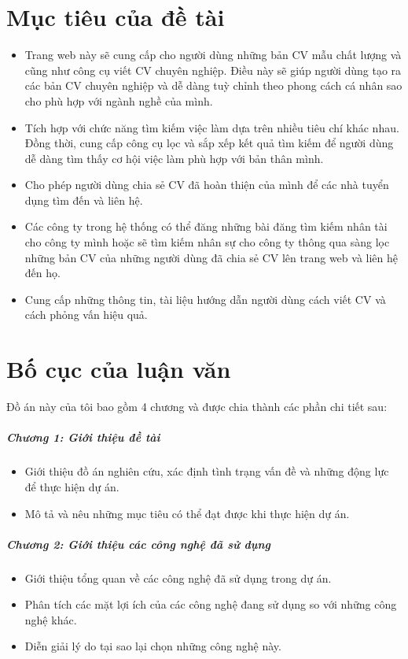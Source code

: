 \section{Mục tiêu của đề tài}

\begin{itemize}
    \item Trang web này sẽ cung cấp cho người dùng những bản CV mẫu chất lượng và cũng như công cụ viết CV chuyên nghiệp. Điều này sẽ giúp người dùng tạo ra các bản CV chuyên nghiệp và dễ dàng tuỳ chỉnh theo phong cách cá nhân sao cho phù hợp với ngành nghề của mình.
    \item Tích hợp với chức năng tìm kiếm việc làm dựa trên nhiều tiêu chí khác nhau. Đồng thời, cung cấp công cụ lọc và sắp xếp kết quả tìm kiếm để người dùng dễ dàng tìm thấy cơ hội việc làm phù hợp với bản thân mình.
    \item Cho phép người dùng chia sẻ CV đã hoàn thiện của mình để các nhà tuyển dụng tìm đến và liên hệ.
    \item Các công ty trong hệ thống có thể đăng những bài đăng tìm kiếm nhân tài cho công ty mình hoặc sẽ tìm kiếm nhân sự cho công ty thông qua sàng lọc những bản CV của những người dùng đã chia sẻ CV lên trang web và liên hệ đến họ.
    \item Cung cấp những thông tin, tài liệu hướng dẫn người dùng cách viết CV và cách phỏng vấn hiệu quả.
\end{itemize}

\section{Bố cục của luận văn}

Đồ án này của tôi bao gồm 4 chương và được chia thành các phần chi tiết sau:

\subparagraph{Chương 1: Giới thiệu đề tài}
\begin{itemize}
    \item Giới thiệu đồ án nghiên cứu, xác định tình trạng vấn đề và những động lực để thực hiện dự án.
    \item Mô tả và nêu những mục tiêu có thể đạt được khi thực hiện dự án.
\end{itemize}

\subparagraph{Chương 2: Giới thiệu các công nghệ đã sử dụng}
\begin{itemize}
    \item Giới thiệu tổng quan về các công nghệ đã sử dụng trong dự án.
    \item Phân tích các mặt lợi ích của các công nghệ đang sử dụng so với những công nghệ khác.
    \item Diễn giải lý do tại sao lại chọn những công nghệ này.
\end{itemize}

